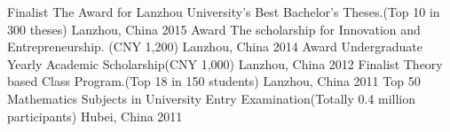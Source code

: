\begin{cvhonors}
  \cvhonor
    {Finalist}
    {The Award for Lanzhou University's Best Bachelor's Theses.(Top 10 in 300 theses)}
    {Lanzhou, China}
    {2015}
  \cvhonor
    {Award}
    {The scholarship for Innovation and Entrepreneurship. (CNY 1,200) }
    {Lanzhou, China}
    {2014}
  \cvhonor
    {Award}
    {Undergraduate Yearly Academic Scholarship(CNY 1,000)}
    {Lanzhou, China}
    {2012}
  \cvhonor
    {Finalist}
    {Theory based Class Program.(Top 18 in 150 students)}
    {Lanzhou, China}
    {2011}
  \cvhonor
    {Top 50}
    {Mathematics Subjects in University Entry Examination(Totally 0.4 million participants)}
    {Hubei, China}
    {2011}
\end{cvhonors}
